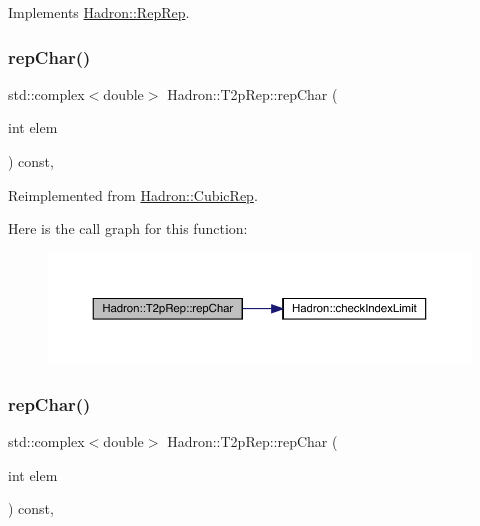 Implements \mbox{\hyperlink{structHadron_1_1RepRep_ab3213025f6de249f7095892109575fde}{Hadron\+::\+Rep\+Rep}}.

\mbox{\label{structHadron_1_1T2pRep_a42f3c130c87e354a8453c53cdb66e1a5}} 
\subsubsection{\texorpdfstring{repChar()}{repChar()}\hspace{0.1cm}{\footnotesize\ttfamily [1/3]}}
{\footnotesize\ttfamily std\+::complex$<$double$>$ Hadron\+::\+T2p\+Rep\+::rep\+Char (\begin{DoxyParamCaption}\item[{int}]{elem }\end{DoxyParamCaption}) const\hspace{0.3cm}{\ttfamily [inline]}, {\ttfamily [virtual]}}



Reimplemented from \mbox{\hyperlink{structHadron_1_1CubicRep_af45227106e8e715e84b0af69cd3b36f8}{Hadron\+::\+Cubic\+Rep}}.

Here is the call graph for this function\+:
\nopagebreak
\begin{figure}[H]
\begin{center}
\leavevmode
\includegraphics[width=350pt]{d8/d6b/structHadron_1_1T2pRep_a42f3c130c87e354a8453c53cdb66e1a5_cgraph}
\end{center}
\end{figure}
\mbox{\label{structHadron_1_1T2pRep_a42f3c130c87e354a8453c53cdb66e1a5}} 
\subsubsection{\texorpdfstring{repChar()}{repChar()}\hspace{0.1cm}{\footnotesize\ttfamily [2/3]}}
{\footnotesize\ttfamily std\+::complex$<$double$>$ Hadron\+::\+T2p\+Rep\+::rep\+Char (\begin{DoxyParamCaption}\item[{int}]{elem }\end{DoxyParamCaption}) const\hspace{0.3cm}{\ttfamily [inline]}, {\ttfamily [virtual]}}



